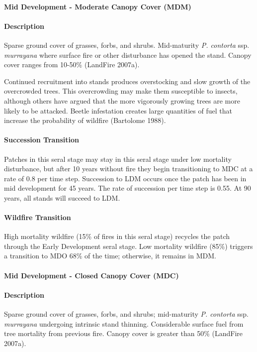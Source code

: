 \noindent\hrulefill

\paragraph{Mid Development - Moderate Canopy Cover (MDM)}

\paragraph{Description} Sparse ground cover of grasses, forbs, and shrubs. Mid-maturity \emph{P. contorta} ssp. \emph{murrayana} where surface fire or other disturbance has opened the stand. Canopy cover ranges from 10-50\% (LandFire 2007a).

Continued recruitment into stands produces overstocking and slow growth of the overcrowded trees. This overcrowding may make them susceptible to insects, although others have argued that the more vigorously growing trees are more likely to be attacked. Beetle infestation creates large quantities of fuel that increase the probability of wildfire (Bartolome 1988).


\paragraph{Succession Transition} Patches in this seral stage may stay in this seral stage under low mortality disturbance, but after 10 years without fire they begin transitioning to MDC at a rate of 0.8 per time step. Succession to LDM occurs once the patch has been in mid development for 45 years. The rate of succession per time step is 0.55. At 90 years, all stands will succeed to LDM.

\paragraph{Wildfire Transition} High mortality wildfire (15\% of fires in this seral stage) recycles the patch through the Early Development seral stage. Low mortality wildfire (85\%) triggers a transition to MDO 68\% of the time; otherwise, it remains in MDM.

\noindent\hrulefill

\paragraph{Mid Development - Closed Canopy Cover (MDC)}

\paragraph{Description} Sparse ground cover of grasses, forbs, and shrubs; mid-maturity \emph{P. contorta} ssp. \emph{murrayana} undergoing intrinsic stand thinning. Considerable surface fuel from tree mortality from previous fire. Canopy cover is greater than 50\% (LandFire 2007a).

